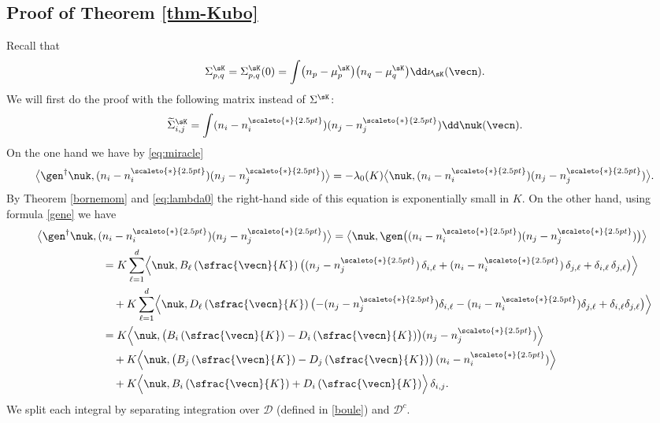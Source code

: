 \subsection{Proof of Theorem \ref{thm-Kubo}}\label{proof:kuboeq}

Recall that
\[
\Sigma^{\sK}_{p,q}=\Sigma^{\sK}_{p,q}(0)=\int \bigl(n_{p}-\mu_{p}^{\sK}\bigr) \bigl(n_{q}-\mu_{q}^{\sK}\bigr) \dd\nu\!_{\sK}(\vecn).
\]
We will first do the proof with the following matrix instead of $\Sigma^{\sK}$:
\[
\widetilde\Sigma^{\sK}_{i,j}=\int (n_{i}-n_{i}^{\scaleto{*}{2.5pt}})(n_{j}-n_{j}^{\scaleto{*}{2.5pt}}) \dd \nuk(\vecn).
\]
On the one hand we have by \eqref{eq:miracle}
\[
\big\langle \gen^{\dagger}\nuk,(n_{i}-n^{\scaleto{*}{2.5pt}}_{i})(n_{j}-n^{\scaleto{*}{2.5pt}}_{j})\big\rangle=-\lambda_{0}(K)
\big\langle\nuk,(n_{i}-n^{\scaleto{*}{2.5pt}}_{i})(n_{j}-n^{\scaleto{*}{2.5pt}}_{j})\big\rangle.
\]
By Theorem \ref{bornemom} and \eqref{eq:lambda0} the right-hand side of this equation is exponentially small in $K$.
On the other hand, using formula \eqref{gene} we have
\begin{align*}
\big\langle \gen^{\dagger}\nuk,(&n_{i}-n^{\scaleto{*}{2.5pt}}_{i})(n_{j}-n^{\scaleto{*}{2.5pt}}_{j})\big\rangle=
\big\langle \nuk,\gen\bigl((n_{i}-n^{\scaleto{*}{2.5pt}}_{i})(n_{j}-n^{\scaleto{*}{2.5pt}}_{j})\bigr)\big\rangle\\
& =K\sum_{\ell=1}^{d}\Bigl\langle\nuk,B_{\ell}\left(\sfrac{\vecn}{K}\right)\bigl((n_{j}-n^{\scaleto{*}{2.5pt}}_{j})\,\delta_{i,\ell}+
(n_{i}-n^{\scaleto{*}{2.5pt}}_{i})\,\delta_{j,\ell} +\delta_{i,\ell}\,\delta_{j,\ell}\bigr)\Bigr\rangle\\
& \quad +K\sum_{\ell=1}^{d}\Bigl\langle\nuk,D_{\ell}\left(\sfrac{\vecn}{K}\right)\bigl(-(n_{j}-n^{\scaleto{*}{2.5pt}}_{j})\delta_{i,\ell}-(n_{i}-n^{\scaleto{*}{2.5pt}}_{i})
\delta_{j,\ell}+\delta_{i,\ell}\delta_{j,\ell}\bigr)\Bigr\rangle\\
& =K\Bigl\langle\nuk,\bigl(B_{i}\left(\sfrac{\vecn}{K}\right)-D_{i}\left(\sfrac{\vecn}{K}\right)\bigr)(n_{j}-n^{\scaleto{*}{2.5pt}}_{j})\Bigr\rangle\\
& \quad +K\Bigl\langle\nuk,\bigl(B_{j}\left(\sfrac{\vecn}{K}\right)-D_{j}\left(\sfrac{\vecn}{K}\right)\bigr)\,(n_{i}-n^{\scaleto{*}{2.5pt}}_{i})
\Bigr\rangle\\
& \quad +K \Bigl\langle\nuk,B_{i}\left(\sfrac{\vecn}{K}\right)+D_{i}\left(\sfrac{\vecn}{K}\right)\Bigr\rangle\, \delta_{i,j}.
\end{align*}
We split each integral by separating integration over $\mathcal{D}$ (defined in \eqref{boule}) and $\mathcal{D}^c$.
